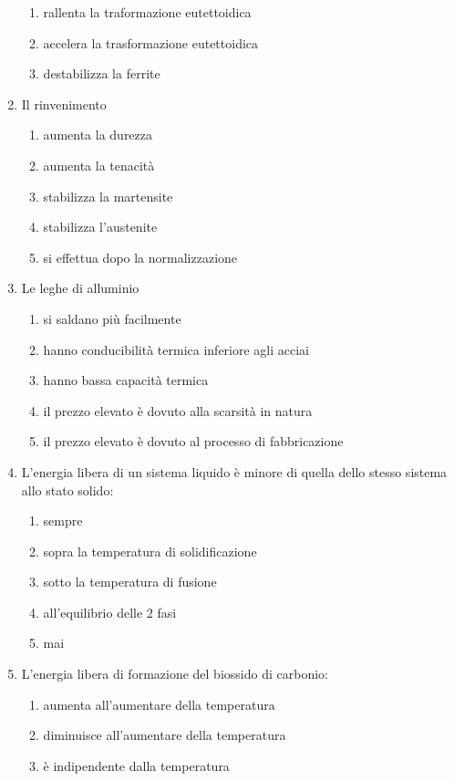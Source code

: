 \begin{enumerate}
\begin{enumerate}
        \item rallenta la traformazione eutettoidica
        \item accelera la trasformazione eutettoidica
        \item destabilizza la ferrite
    \end{enumerate}
    \item Il rinvenimento
    \begin{enumerate}
        \item aumenta la durezza
        \item aumenta la tenacità
        \item stabilizza la martensite
        \item stabilizza l'austenite
        \item si effettua dopo la normalizzazione
    \end{enumerate}
    \item Le leghe di alluminio
    \begin{enumerate}
        \item si saldano più facilmente
        \item hanno conducibilità termica inferiore agli acciai
        \item hanno bassa capacità termica
        \item il prezzo elevato è dovuto alla scarsità in natura
        \item il prezzo elevato è dovuto al processo di fabbricazione
    \end{enumerate}
    \item L’energia libera di un sistema liquido è minore di quella dello stesso sistema allo stato solido:
    \begin{enumerate}
        \item sempre
        \item sopra la temperatura di solidificazione
        \item sotto la temperatura di fusione
        \item all’equilibrio delle 2 fasi
        \item mai
    \end{enumerate}
    \item L'energia libera di formazione del biossido di carbonio:
    \begin{enumerate}
        \item aumenta all’aumentare della temperatura
        \item diminuisce all’aumentare della temperatura
        \item è indipendente dalla temperatura

\end{enumerate}
\end{enumerate}
